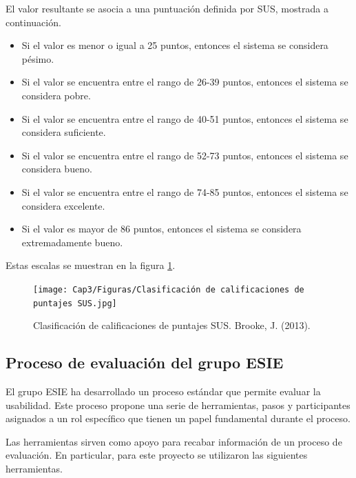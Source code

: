 El valor resultante se asocia a una puntuación definida por SUS, mostrada a continuación.

\begin{itemize}
  \item Si el valor es menor o igual a 25 puntos, entonces el sistema se considera pésimo.
  \item Si el valor se encuentra entre el rango de 26-39 puntos, entonces el sistema se considera pobre.
  \item Si el valor se encuentra entre el rango de 40-51 puntos, entonces el sistema se considera suficiente.
  \item Si el valor se encuentra entre el rango de 52-73 puntos, entonces el sistema se considera bueno.
  \item Si el valor se encuentra entre el rango de 74-85 puntos, entonces el sistema se considera excelente.
  \item Si el valor es mayor de 86 puntos, entonces el sistema se considera extremadamente bueno.
\end{itemize}

Estas escalas se muestran en la figura \ref{fig:36}.

\begin{figure}
  \centering
  \texttt{[image: Cap3/Figuras/Clasificación de calificaciones de puntajes SUS.jpg]}
  \caption{Clasificación de calificaciones de puntajes SUS. Brooke, J. (2013).}
  \label{fig:36}
\end{figure}


\subsection{Proceso de evaluación del grupo ESIE}
\label{ESIECap3}

El grupo ESIE ha desarrollado un proceso estándar que permite evaluar la usabilidad. Este proceso propone una serie de herramientas, pasos y participantes asignados a un rol específico que tienen un papel fundamental durante el proceso.

Las herramientas sirven como apoyo para recabar información de un proceso de evaluación. En particular, para este proyecto se utilizaron las siguientes herramientas.

